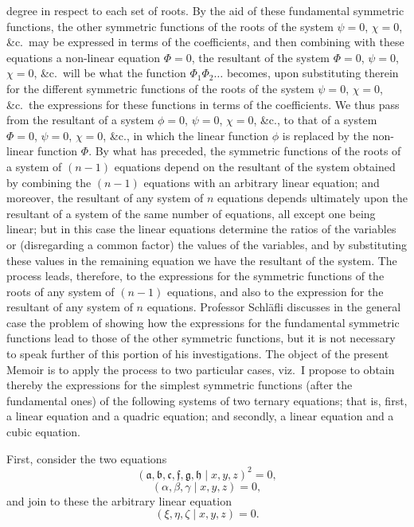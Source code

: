 \documentclass[11pt]{article}
\begin{document}
degree in respect to each set of roots. By the aid of these fundamental symmetric functions, the other symmetric functions of the roots of the system $\psi = 0$, $\chi = 0$, \&c.\ may be expressed in terms of the coefficients, and then combining with these equations a non-linear equation $\Phi = 0$, the resultant of the system $\Phi = 0$, $\psi = 0$, $\chi = 0$, \&c.\ will be what the function $\Phi_1 \Phi_2 \ldots$ becomes, upon substituting therein for the different symmetric functions of the roots of the system $\psi = 0$, $\chi = 0$, \&c.\ the expressions for these functions in terms of the coefficients. We thus pass from the resultant of a system $\phi = 0$, $\psi = 0$, $\chi = 0$, \&c., to that of a system $\Phi = 0$, $\psi = 0$, $\chi = 0$, \&c., in which the linear function $\phi$ is replaced by the non-linear function $\Phi$. By what has preceded, the symmetric functions of the roots of a system of $(n - 1)$ equations depend on the resultant of the system obtained by combining the $(n - 1)$ equations with an arbitrary linear equation; and moreover, the resultant of any system of $n$ equations depends ultimately upon the resultant of a system of the same number of equations, all except one being linear; but in this case the linear equations determine the ratios of the variables or (disregarding a common factor) the values of the variables, and by substituting these values in the remaining equation we have the resultant of the system. The process leads, therefore, to the expressions for the symmetric functions of the roots of any system of $(n-1)$ equations, and also to the expression for the resultant of any system of $n$ equations. Professor Schl\"afli discusses in the general case the problem of showing how the expressions for the fundamental symmetric functions lead to those of the other symmetric functions, but it is not necessary to speak further of this portion of his investigations. The object of the present Memoir is to apply the process to two particular cases, viz.\ I propose to obtain thereby the expressions for the simplest symmetric functions (after the fundamental ones) of the following systems of two ternary equations; that is, first, a linear equation and a quadric equation; and secondly, a linear equation and a cubic equation.

\medskip

\noindent First, consider the two equations
\[
(\mathfrak{a}, \mathfrak{b}, \mathfrak{c}, \mathfrak{f}, \mathfrak{g}, \mathfrak{h} \mid x, y, z)^2 = 0,
\]
\[
(\alpha, \beta, \gamma \mid x, y, z) = 0,
\]
and join to these the arbitrary linear equation
\[
(\xi, \eta, \zeta \mid x, y, z) = 0.
\]
\end{document}
